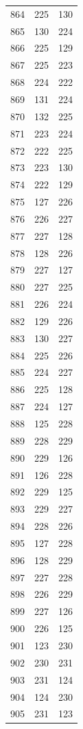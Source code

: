\documentclass[a4paper,11pt]{article}
\begin{document}
\begin{center}
\begin{longtable}{|R{1.5cm}|R{1.5cm}|R{1.5cm}|}
  864 &  225 &  130 \\
  865 &  130 &  224 \\
  866 &  225 &  129 \\
  867 &  225 &  223 \\
  868 &  224 &  222 \\
  869 &  131 &  224 \\
  870 &  132 &  225 \\
  871 &  223 &  224 \\
  872 &  222 &  225 \\
  873 &  223 &  130 \\
  874 &  222 &  129 \\
  875 &  127 &  226 \\
  876 &  226 &  227 \\
  877 &  227 &  128 \\
  878 &  128 &  226 \\
  879 &  227 &  127 \\
  880 &  227 &  225 \\
  881 &  226 &  224 \\
  882 &  129 &  226 \\
  883 &  130 &  227 \\
  884 &  225 &  226 \\
  885 &  224 &  227 \\
  886 &  225 &  128 \\
  887 &  224 &  127 \\
  888 &  125 &  228 \\
  889 &  228 &  229 \\
  890 &  229 &  126 \\
  891 &  126 &  228 \\
  892 &  229 &  125 \\
  893 &  229 &  227 \\
  894 &  228 &  226 \\
  895 &  127 &  228 \\
  896 &  128 &  229 \\
  897 &  227 &  228 \\
  898 &  226 &  229 \\
  899 &  227 &  126 \\
  900 &  226 &  125 \\
  901 &  123 &  230 \\
  902 &  230 &  231 \\
  903 &  231 &  124 \\
  904 &  124 &  230 \\
  905 &  231 &  123 \\

\end{longtable}
\end{center}
\end{document}
